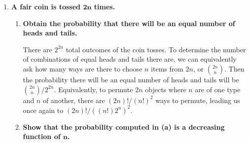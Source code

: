 \documentclass[10pt, oneside]{article}
\begin{document}
\begin{enumerate}[label=3.\arabic*]
\textbf{(c)} The desired probability is:

\[ P(\text{reads at least $A_1$ and $A_2$} \ | \ \text{reads at least one paper} ) \]

Observe that $P(\text{reads at least one paper}) = P \big( \bigcup^3_{i = 1} A_i \big)$, and $P(\text{reads at least $A$ and $B$}) = P\Big( (A_1 \cap A_2) \cup \Big( \bigcap^3_{i=1} A_i \Big) \Big)$. Then the conditional probability can be rewritten as:

\[ \frac{P\Big( \Big( (A_1 \cap A_2) \cup \Big( \bigcap^3_{i=1} A_i \Big) \Big) \cap \big( \bigcup^3_{i = 1} A_i \big) \Big)}{P \big( \bigcup^3_{i = 1} A_i \big)} \]

Observe that the numerator reduces simply to $P(A_1 \cap A_2)$. Then finally:

\begin{align*}
\frac{P(A_1 \cap A_2)}{P \big( \bigcup^3_{i = 1} A_i \big)} = \boxed{ \frac{0.08}{0.35} = 0.229}
\end{align*}

\newpage
\item  \begin{tcolorbox}[
  colback=Cerulean!5!white,
  colframe=Cerulean!75!black]
\textbf{A fair coin is tossed $\bm{2n}$ times.}
\end{tcolorbox}

	\begin{enumerate}
	\item  \begin{tcolorbox}[
	  colback=Cerulean!5!white,
	  colframe=Cerulean!75!black]
	\textbf{Obtain the probability that there will be an equal number of heads and tails.}
	\end{tcolorbox}
	
	There are $2^{2n}$ total outcomes of the coin tosses. To determine the number of combinations of equal heads and tails there are, we can equivalently ask how many ways are there to choose $n$ items from $2n$, or $\binom{2n}{n}$. Then the probability there will be an equal number of heads and tails will be $\boxed{ \binom{2n}{n} / 2^{2n} }$. Equivalently, to permute $2n$ objects where $n$ are of one type and $n$ of another, there are $(2n)! / (n!)^2$ ways to permute, leading us once again to $\boxed{(2n)! / ((n!) 2^{n})^2}$.
	
	\item  \begin{tcolorbox}[
	  colback=Cerulean!5!white,
	  colframe=Cerulean!75!black]
	\textbf{Show that the probability computed in (a) is a decreasing function of $\bm{n}$.}
	\end{tcolorbox}
	

\end{enumerate}
\end{enumerate}
\end{document}
